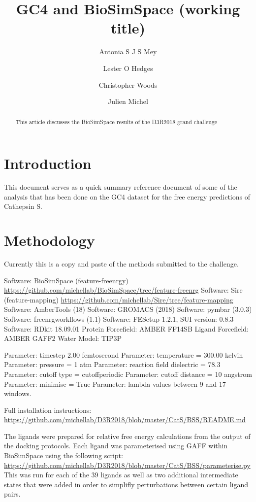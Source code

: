 \documentclass[9pt,comparison]{livecoms}
\title{GC4 and BioSimSpace (working title)}
\author[1*]{Antonia S J S Mey}
\author[2*\authfn{1}\authfn{3}]{Lester O Hedges}
\author[2\authfn{1}\authfn{4}]{Christopher Woods}
\author[1]{Julien Michel }
\affil[1]{Edinburgh}
\affil[2]{Bristol}
\begin{document}
\begin{frontmatter}
\maketitle

\begin{abstract}
This article discusses the BioSimSpace results of the D3R2018 grand challenge
\end{abstract}

\end{frontmatter}




\section{Introduction}

This document serves as a quick summary reference document of some of the analysis that has been done on the GC4 dataset for the free energy predictions of Cathepsin S. 

\section{Methodology}

Currently this is a copy and paste of the methods submitted to the challenge.

Software: BioSimSpace (feature-freenrgy) \url{https://github.com/michellab/BioSimSpace/tree/feature-freenrg}
Software: Sire (feature-mapping) \url{https://github.com/michellab/Sire/tree/feature-mapping}
Software: AmberTools (18)
Software: GROMACS (2018)
Software: pymbar (3.0.3)
Software: freenrgworkflows (1.1)
Software: FESetup 1.2.1, SUI version: 0.8.3
Software: RDkit 18.09.01
Protein Forcefield: AMBER FF14SB
Ligand Forcefield: AMBER GAFF2
Water Model: TIP3P

Parameter: timestep 2.00 femtosecond
Parameter: temperature = 300.00 kelvin
Parameter: pressure = 1 atm
Parameter: reaction field dielectric = 78.3
Parameter: cutoff type = cutoffperiodic
Parameter: cutoff distance = 10 angstrom
Parameter: minimise = True
Parameter: lambda values between 9 and 17 windows. 

Full installation instructions:
\url{https://github.com/michellab/D3R2018/blob/master/CatS/BSS/README.md}

The ligands were prepared for relative free energy calculations from the output
of the docking protocols. Each ligand was parameterised using GAFF within
BioSimSpace using the following script:
\url{https://github.com/michellab/D3R2018/blob/master/CatS/BSS/parameterise.py}
This was run for each of the 39 ligands as well as two additional intermediate
states that were added in order to simplifly perturbations between certain
ligand pairs.
\end{document}

